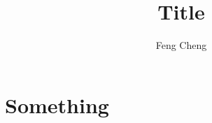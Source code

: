 \documentclass{amsbook}
\theoremstyle{plain}
\theoremstyle{definition}
\theoremstyle{remark}
\theoremstyle{plain}
\begin{document}
\title{Title}
\author{Feng Cheng}
\address{Department of Mathematics\\ University of Washington\\ Seattle, WA 98195\\ USA}

\maketitle

\tableofcontents
\chapter{Something}
\end{document}
